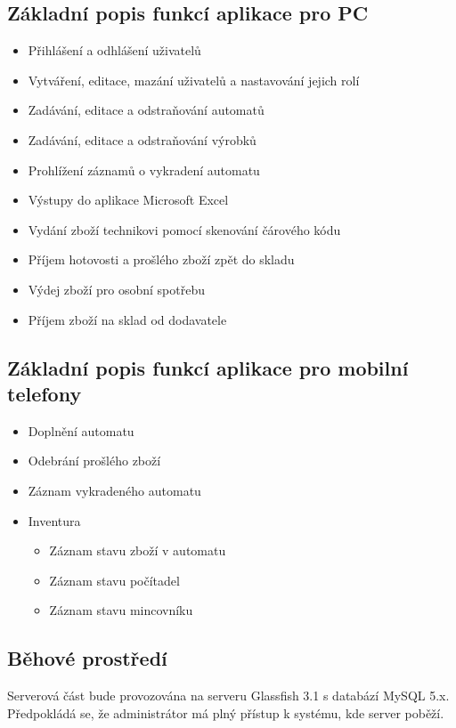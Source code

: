 \documentclass[a4paper,10pt]{article}
\begin{document}
\subsection{Základní popis funkcí aplikace pro PC}
\begin{itemize}
  \item Přihlášení a odhlášení uživatelů
  \item Vytváření, editace, mazání uživatelů a nastavování jejich rolí
  \item Zadávání, editace a odstraňování automatů
  \item Zadávání, editace a odstraňování výrobků
  \item Prohlížení záznamů o vykradení automatu
  \item Výstupy do aplikace Microsoft Excel
  \item Vydání zboží technikovi pomocí skenování čárového kódu
  \item Příjem hotovosti a prošlého zboží zpět do skladu
  \item Výdej zboží pro osobní spotřebu
  \item Příjem zboží na sklad od dodavatele
\end{itemize}

\subsection{Základní popis funkcí aplikace pro mobilní telefony}

\begin{itemize}
  \item Doplnění automatu
  \item Odebrání prošlého zboží
  \item Záznam vykradeného automatu
  \item Inventura
  \begin{itemize}
  	\item Záznam stavu zboží v automatu
  	\item Záznam stavu počítadel
  	\item Záznam stavu mincovníku
  \end{itemize}
\end{itemize}

\subsection{Běhové prostředí}
Serverová část bude provozována na serveru Glassfish 3.1 s databází MySQL 5.x. Předpokládá se, že administrátor má plný přístup k systému, kde server poběží.
\end{document}
